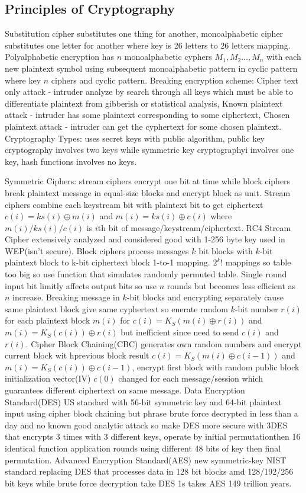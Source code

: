 \documentclass[9pt]{extarticle}
\begin{document}
\begin{multicols}{2}
\subsection{Principles of Cryptography}

Substitution cipher substitutes one thing for another, monoalphabetic cipher substitutes one letter for another where key is 26 letters to 26 letters mapping. Polyalphabetic encryption has $n$ monoalphabetic cyphers $M_1,M_2\dots,M_n$ with each new plaintext symbol using subsequent monoalphabetic pattern in cyclic pattern where key $n$ ciphers and cyclic pattern. Breaking encryption scheme: Cipher text only attack - intruder analyze by search through all keys which must be able to differentiate plaintext from gibberish or statistical analysis, Known plaintext attack - intruder has some plaintext corresponding to some ciphertext, Chosen plaintext attack - intruder can get the cyphertext for some chosen plaintext. Cryptography Types: uses secret keys with public algorithm, public key cryptography involves two keys while symmetric key cryptographyi involves one key, hash functions involves no keys.

Symmetric Ciphers: stream ciphers encrypt one bit at time while block ciphers break plaintext message in equal-size blocks and encrypt block as unit. Stream ciphers combine each keystream bit with plaintext bit to get ciphertext $c(i)=ks(i)\oplus{m(i)}$ and $m(i)=ks(i)\oplus{c(i)}$ where $m(i)/ks(i)/c(i)$ is $i$th bit of message/keystream/ciphertext. RC4 Stream Cipher extensively analyzed and considered good with 1-256 byte key used in WEP(isn't secure). Block ciphers process messages $k$ bit blocks with $k$-bit plaintext block to k-bit ciphertext block 1-to-1 mapping.  $2^k!$ mappings so table too big so use function that simulates randomly permuted table. Single round input bit limitly affects output bits so use $n$ rounds but becomes less efficient as $n$ increase. Breaking message in $k$-bit blocks and encrypting separately cause same plaintext block give same cyphertext so enerate random $k$-bit number $r(i)$ for each plaintext block $m(i)$ for $c(i)=K_S(m(i)\oplus{r(i)})$ and $m(i)=K_S(c(i))\oplus{r(i)}$ but inefficient since need to send $c(i)$ and $r(i)$. Cipher Block Chaining(CBC) generates own random numbers and encrypt current block wit hprevious block result $c(i)=K_S(m(i)\oplus{c(i-1)})$ and $m(i)=K_S(c(i))\oplus{c(i-1)}$, encrypt first block with random public block initialization vector(IV) $c(0)$ changed for each message/session which guarantees different ciphertext on same message. Data Encryption Standard(DES) US standard with 56-bit symmetric key and 64-bit plaintext input using cipher block chaining but phrase brute force decrypted in less than a day and no known good analytic attack so make DES more secure with 3DES that encrypts 3 times with 3 different keys, operate by initial permutationthen 16 identical function application rounds using different 48 bits of key then final permutation. Advanced Encryption Standard(AES) new symmetric-key NIST standard replacing DES that processes data in 128 bit blocks amd 128/192/256 bit keys while brute force decryption take DES 1s takes AES 149 trillion years.


\end{multicols}
\end{document}
